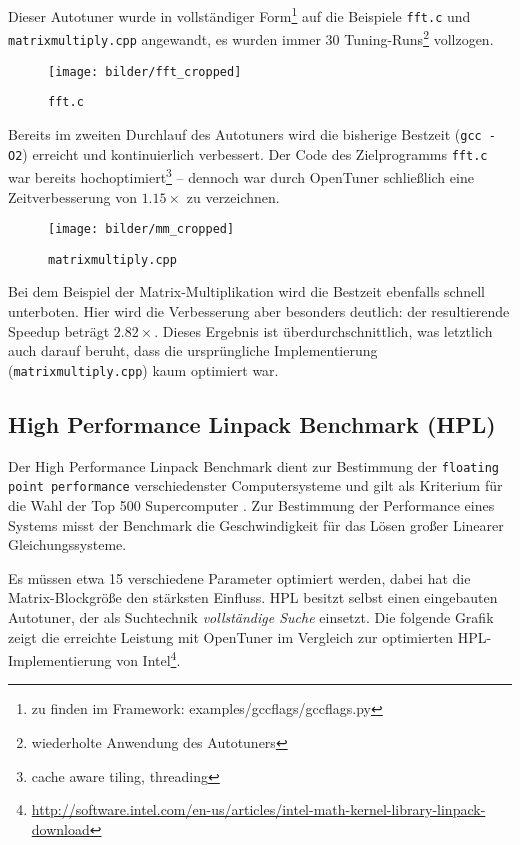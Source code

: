 \documentclass[a4paper,11pt]{scrartcl}
\begin{document}
Dieser Autotuner wurde in vollständiger Form\footnote{zu finden im Framework: 
examples/gccflags/gccflags.py} auf die Beispiele \texttt{fft.c} 
und \texttt{matrixmultiply.cpp} angewandt, es wurden immer 30 Tuning-Runs\footnote{wiederholte Anwendung 
des Autotuners} vollzogen.

\begin{figure}[h]
\begin{center}
\texttt{[image: bilder/fft\_cropped]}
\cite{OT-paper} \caption{\texttt{fft.c}}
\end{center}
\end{figure}

Bereits im zweiten Durchlauf des Autotuners wird die bisherige Bestzeit (\texttt{gcc -O2}) 
erreicht und kontinuierlich verbessert. Der Code des Zielprogramms \texttt{fft.c} war bereits
hochoptimiert\footnote{cache aware tiling, threading} -- dennoch war durch OpenTuner schließlich
eine Zeitverbesserung von $1.15 \times$  zu verzeichnen.

\begin{figure}[h]
\begin{center}
\texttt{[image: bilder/mm\_cropped]}
\cite{OT-paper} \caption{\texttt{matrixmultiply.cpp}}
\end{center}
\end{figure}

Bei dem Beispiel der Matrix-Multiplikation wird die Bestzeit ebenfalls schnell unterboten.
Hier wird die Verbesserung aber besonders deutlich: der resultierende Speedup beträgt
$2.82 \times$. Dieses Ergebnis ist überdurchschnittlich, was letztlich auch darauf beruht,
dass die ursprüngliche Implementierung (\texttt{matrixmultiply.cpp}) kaum optimiert war.

\subsection{High Performance Linpack Benchmark (HPL)}
Der High Performance Linpack Benchmark \cite{hpl} dient zur Bestimmung der 
\texttt{floating point performance} verschiedenster Computersysteme und gilt als 
Kriterium für die Wahl der Top 500 Supercomputer \cite{top500}.
Zur Bestimmung der Performance eines Systems misst der Benchmark die Geschwindigkeit 
für das Lösen großer Linearer Gleichungssysteme. \newline

Es müssen etwa 15 verschiedene Parameter
optimiert werden, dabei hat die Matrix-Blockgröße den stärksten Einfluss.
HPL besitzt selbst einen eingebauten Autotuner, der als Suchtechnik 
\emph{vollständige Suche} einsetzt. Die folgende Grafik zeigt die erreichte Leistung
mit OpenTuner im Vergleich zur optimierten HPL-Implementierung von Intel\footnote{\url{http://software.intel.com/en-us/articles/intel-math-kernel-library-linpack-download}}.
\end{document}
